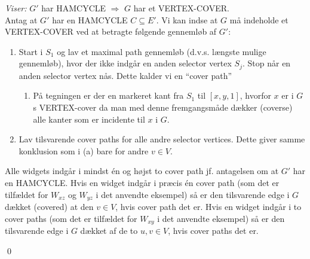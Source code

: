 \textit{Viser:} $G'$ har HAMCYCLE $\Longrightarrow$ $G$ har et VERTEX-COVER. \\

Antag at $G'$ har en HAMCYCLE $C \subseteq E'$. Vi kan indse at $G$ må indeholde et VERTEX-COVER ved at betragte følgende gennemløb af $G'$:
\begin{enumerate}
	\item Start i $S_1$ og lav et maximal path gennemløb (d.v.s. længste mulige gennemløb), hvor der ikke indgår en anden selector vertex $S_j$. Stop når en anden selector vertex nås. Dette kalder vi en ``cover path'' 
	\begin{enumerate}
		\item På tegningen er der en markeret kant fra $S_1$ til $[x,y,1]$, hvorfor $x$ er i $G$s VERTEX-cover da man med denne fremgangsmåde dækker (coverse) alle kanter som er incidente til $x$ i $G$.
	\end{enumerate} 
	\item Lav tilsvarende cover paths for alle andre selector vertices. Dette giver samme konklusion som i (a) bare for andre $v \in V$.  
\end{enumerate}
Alle widgets indgår i mindst én og højst to cover path jf. antagelsen om at $G'$ har en HAMCYCLE. Hvis en widget indgår i præcis én cover path (som det er tilfældet for $W_{xz}$ og $W_{yz}$ i det anvendte eksempel) så er den tilsvarende edge i $G$ dækket (covered) at den $v \in V$, hvis cover path det er. Hvis en widget indgår i to cover paths (som det er tilfældet for $W_{xy}$ i det anvendte eksempel) så er den tilsvarende edge i $G$ dækket af de to $u,v\in V$, hvis cover paths det er. 
\begin{flushright}
	\qed
\end{flushright}